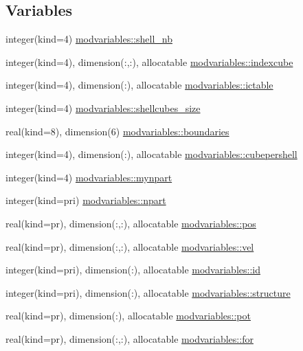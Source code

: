 \subsection*{Variables}
\begin{DoxyCompactItemize}
\item 
integer(kind=4) \hyperlink{namespacemodvariables_a8e749d6e70dade5cb6d75a09a99cefd7}{modvariables\+::shell\+\_\+nb}
\item 
integer(kind=4), dimension(\+:,\+:), allocatable \hyperlink{namespacemodvariables_a46e17f78883958892917ac536b4ab1b1}{modvariables\+::indexcube}
\item 
integer(kind=4), dimension(\+:), allocatable \hyperlink{namespacemodvariables_a2de620524061386e6addabfa15a6b020}{modvariables\+::ictable}
\item 
integer(kind=4) \hyperlink{namespacemodvariables_a9b7ba2cda6114449e99e9f7f348d4c32}{modvariables\+::shellcubes\+\_\+size}
\item 
real(kind=8), dimension(6) \hyperlink{namespacemodvariables_a45ca9fc03093230dfc1beb56cacb8e80}{modvariables\+::boundaries}
\item 
integer(kind=4), dimension(\+:), allocatable \hyperlink{namespacemodvariables_a2c3c2168db3dc7c7b511d9c5a2715de5}{modvariables\+::cubepershell}
\item 
integer(kind=4) \hyperlink{namespacemodvariables_a6b2f4aac9da282a26d2ff36628fa0c7b}{modvariables\+::mynpart}
\item 
integer(kind=pri) \hyperlink{namespacemodvariables_a003cd4a3edf99a1c8f83cef4c61eb690}{modvariables\+::npart}
\item 
real(kind=pr), dimension(\+:,\+:), allocatable \hyperlink{namespacemodvariables_a1eb22f6b56e0963ff4d88a5114903517}{modvariables\+::pos}
\item 
real(kind=pr), dimension(\+:,\+:), allocatable \hyperlink{namespacemodvariables_aea9c591211b0b8c19d6ab8d5b017c789}{modvariables\+::vel}
\item 
integer(kind=pri), dimension(\+:), allocatable \hyperlink{namespacemodvariables_ac2069a0665c46610db9e57a5d5eaf195}{modvariables\+::id}
\item 
integer(kind=pri), dimension(\+:), allocatable \hyperlink{namespacemodvariables_a93c25eb46b5370bd8153733e03f3008d}{modvariables\+::structure}
\item 
real(kind=pr), dimension(\+:), allocatable \hyperlink{namespacemodvariables_a9076676c4847d18b42f53f70868d9242}{modvariables\+::pot}
\item 
real(kind=pr), dimension(\+:,\+:), allocatable \hyperlink{namespacemodvariables_a4c6b0b1717ed4089025045d3ef290104}{modvariables\+::for}

\end{DoxyCompactItemize}
